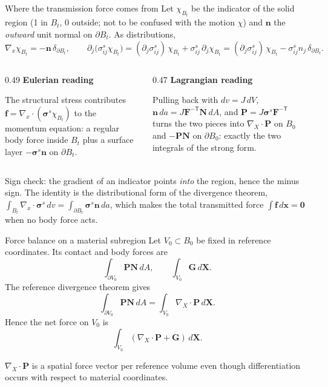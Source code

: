 \documentclass[aspectratio=169,11pt]{beamer}
\newcommand{\xvec}{\bm{x}}
\newcommand{\Xvec}{\bm{X}}
\newcommand{\fvec}{\bm{f}}
\newcommand{\Gvec}{\bm{G}}
\newcommand{\Nvec}{\bm{N}}
\newcommand{\nvec}{\bm{n}}
\newcommand{\Ften}{\bm{F}}
\newcommand{\Pten}{\bm{P}}
\newcommand{\sigten}{\bm{\sigma}}
\newcommand{\Div}{\nabla_{\!X}\!\cdot}
\newcommand{\gradx}{\nabla_{\!x}}
\begin{document}
\begin{frame}{Where the transmission force comes from}
\small
Let \(\chi_{B_t}\) be the indicator of the solid region (1 in \(B_t\), 0 outside; not to be confused with the motion \(\chi\)) and \(\nvec\) the \emph{outward} unit normal on \(\partial B_t\). As distributions,
\[
  \gradx\chi_{B_t}=-\nvec\,\delta_{\partial B_t},
  \qquad
  \partial_j\big(\sigma^s_{ij}\chi_{B_t}\big)
  =(\partial_j\sigma^s_{ij})\,\chi_{B_t}+\sigma^s_{ij}\,\partial_j\chi_{B_t}
  =(\partial_j\sigma^s_{ij})\,\chi_{B_t}-\sigma^s_{ij}n_j\,\delta_{\partial B_t}.
\]
\begin{columns}[T,onlytextwidth]
\begin{column}{0.49\textwidth}
\textbf{Eulerian reading}

The structural stress contributes \(\fvec=\gradx\!\cdot(\sigten^{s}\chi_{B_t})\) to the momentum equation: a regular body force inside \(B_t\) plus a surface layer \(-\sigten^s\nvec\) on \(\partial B_t\).
\end{column}
\begin{column}{0.47\textwidth}
\textbf{Lagrangian reading}

Pulling back with \(dv=J\,dV\), \(\nvec\,da=J\Ften^{-\mathsf T}\Nvec\,dA\), and \(\Pten=J\sigten^s\Ften^{-\mathsf T}\) turns the two pieces into \(\Div\Pten\) on \(B_0\) and \(-\Pten\Nvec\) on \(\partial B_0\): exactly the two integrals of the strong form.
\end{column}
\end{columns}
\medskip
\begin{punchbox}
\small Sign check: the gradient of an indicator points \emph{into} the region, hence the minus sign. The identity is the distributional form of the divergence theorem, \(\int_{B_t}\gradx\!\cdot\sigten^s\,dv=\int_{\partial B_t}\sigten^s\nvec\,da\), which makes the total transmitted force \(\int\fvec\,d\xvec=\bm{0}\) when no body force acts.
\end{punchbox}
\end{frame}

\begin{frame}{Force balance on a material subregion}
Let \(V_0\subset B_0\) be fixed in reference coordinates. Its contact and body forces are
\[
  \int_{\partial V_0}\Pten\Nvec\,dA,
  \qquad
  \int_{V_0}\Gvec\,d\Xvec .
\]
The reference divergence theorem gives
\[
  \int_{\partial V_0}\Pten\Nvec\,dA
  =
  \int_{V_0}\Div\Pten\,d\Xvec .
\]
Hence the net force on \(V_0\) is
\[
  \int_{V_0}(\Div\Pten+\Gvec)\,d\Xvec .
\]
\begin{punchbox}
\small \(\Div\Pten\) is a spatial force vector per reference volume even though differentiation occurs with respect to material coordinates.
\end{punchbox}
\end{frame}
\end{document}
